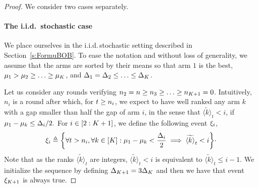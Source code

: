 \begin{proof} %
We consider two cases separately.
	\paragraph{The i.i.d.~stochastic case}
	We place ourselves in the i.i.d.\,stochastic setting described 
	in Section~\ref{s:FormuBOB}.
	To ease the notation and without loss of generality, we  assume that 
	the arms are sorted by their means so that arm $1$ is the best,
	$\mu_1>\mu_2\geq\ldots\geq\mu_{K}$, and $\Delta_1=\Delta_2\leq\ldots\leq\Delta_{K}$.
	
	Let us consider any %
	rounds verifying 
	$n_2=n\geq n_3\geq\ldots\geq 
	n_{K+1} = 0 $.  Intuitively, $n_i$ is a round 
	after which, for $t\geq n_i$, we expect \Pone{} to 
	have well ranked any arm $k$ with a 
	gap smaller than half the gap of arm $i$,  in the sense that $\tilde{\langle k \rangle}_t< i$, 
	if $ \mu_1-\mu_k\leq\Delta_{i}/2.$
	For $i\in[2:K+1]$, we define the following event $\xi_i$,
	\begin{equation}\label{eq:eventbob}
	\xi_i
	\triangleq
	\left\{
	\forall t> n_{i} , 
	\forall k\in[K] : \mu_1-\mu_k<\frac{\Delta_{i}}{2}\implies \widetilde{\langle k \rangle}_t< i
	\right\}\!\cdot
	\end{equation}%
	Note that as the ranks $\tilde{\langle k \rangle}_t$ 
	are integers, $\tilde{\langle k \rangle}_t< i$ is 
	equivalent to $\tilde{\langle k \rangle}_t\leq i-1$.
	We initialize the sequence by defining $\Delta_{K+1}=3\Delta_{K}$ 
	and then we have that event $\xi_{K+1}$ is always true.
	

\end{proof}

